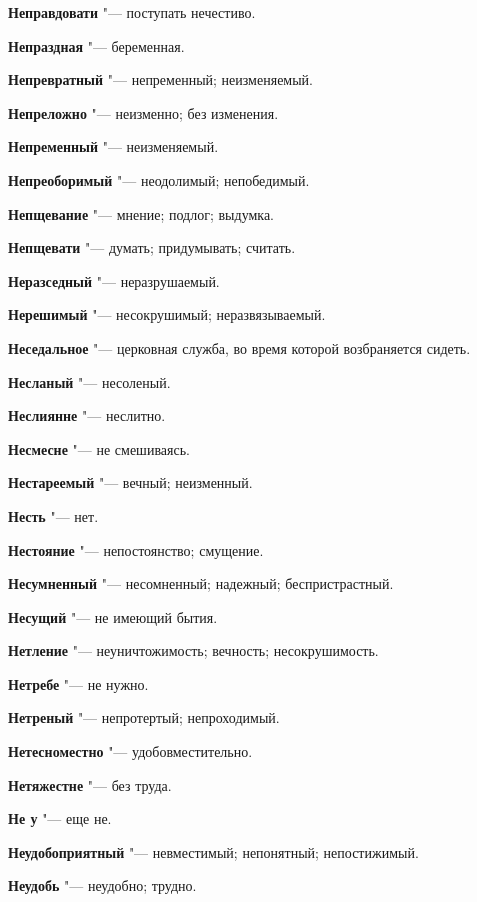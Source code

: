 \begin{mymulticols}
\noindent\textbf{Неправдовати} "--- поступать нечестиво. 

\noindent\textbf{Непраздная} "--- беременная. 

\noindent\textbf{Непревратный} "--- непременный; неизменяемый. 

\noindent\textbf{Непреложно} "--- неизменно; без изменения. 

\noindent\textbf{Непременный} "--- неизменяемый. 

\noindent\textbf{Непреоборимый} "--- неодолимый; непобедимый. 

\noindent\textbf{Непщевание} "--- мнение; подлог; выдумка. 

\noindent\textbf{Непщевати} "--- думать; придумывать; считать. 

\noindent\textbf{Неразседный} "--- неразрушаемый. 

\noindent\textbf{Нерешимый} "--- несокрушимый; неразвязываемый. 

\noindent\textbf{Неседальное} "--- церковная служба, во время которой возбраняется сидеть. 

\noindent\textbf{Несланый} "--- несоленый. 

\noindent\textbf{Неслиянне} "--- неслитно. 

\noindent\textbf{Несмесне} "--- не смешиваясь. 

\noindent\textbf{Нестареемый} "--- вечный; неизменный. 

\noindent\textbf{Несть} "--- нет. 

\noindent\textbf{Нестояние} "--- непостоянство; смущение. 

\noindent\textbf{Несумненный} "--- несомненный; надежный; беспристрастный. 

\noindent\textbf{Несущий} "--- не имеющий бытия. 

\noindent\textbf{Нетление} "--- неуничтожимость; вечность; несокрушимость. 

\noindent\textbf{Нетребе} "--- не нужно. 

\noindent\textbf{Нетреный} "--- непротертый; непроходимый. 

\noindent\textbf{Нетесноместно} "--- удобовместительно. 

\noindent\textbf{Нетяжестне} "--- без труда. 

\noindent\textbf{Не у} "--- еще не. 

\noindent\textbf{Неудобоприятный} "--- невместимый; непонятный; непостижимый. 

\noindent\textbf{Неудобь} "--- неудобно; трудно. 


\end{mymulticols}
